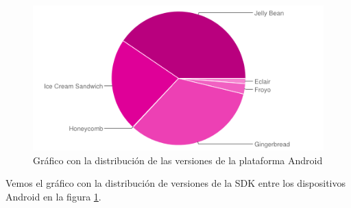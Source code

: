 \begin{figure}[ht]
\centering
\includegraphics[scale=0.8]{./imgs/esquemas/chart.png}
\caption{Gráfico con la distribución de las versiones de la plataforma Android}
\label{fig:android_distribucion}
\end{figure}
Vemos el gráfico con la distribución de versiones de la SDK entre los dispositivos Android en la figura \ref{fig:android_distribucion}.


